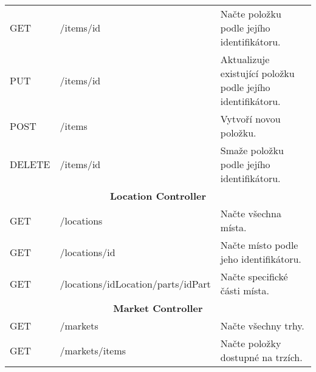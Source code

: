 \begin{longtable}{|l|l|p{}|}
    GET             & /items/{id}                            & Načte položku podle jejího identifikátoru.                                                                                                 \\
    PUT             & /items/{id}                            & Aktualizuje existující položku podle jejího identifikátoru.                                                                                \\
    POST            & /items                                 & Vytvoří novou položku.                                                                                                                     \\
    DELETE          & /items/{id}                            & Smaže položku podle jejího identifikátoru.                                                                                                 \\
    \hline
    \multicolumn{3}{|c|}{\textbf{Location Controller}}                                                                                                                                                    \\
    \hline
    GET             & /locations                             & Načte všechna místa.                                                                                                                       \\
    GET             & /locations/{id}                        & Načte místo podle jeho identifikátoru.                                                                                                     \\
    GET             & /locations/{idLocation}/parts/{idPart} & Načte specifické části místa.                                                                                                              \\%
    \hline
    \multicolumn{3}{|c|}{\textbf{Market Controller}}                                                                                                                                                      \\
    \hline
    GET             & /markets                               & Načte všechny trhy.                                                                                                                        \\
    GET             & /markets/items                         & Načte položky dostupné na trzích.                                                                                                          \\

\end{longtable}
